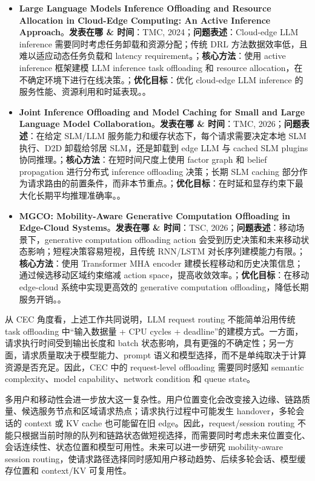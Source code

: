 \documentclass[a4paper,twocolumn,10pt]{ctexart}
\begin{document}
\begin{itemize}
\item \textbf{Large Language Models Inference Offloading and Resource Allocation in Cloud-Edge Computing: An Active Inference Approach}。\textbf{发表在哪 \& 时间}：TMC, 2024；\textbf{问题表述}：Cloud-edge LLM inference 需要同时考虑任务卸载和资源分配；传统 DRL 方法数据效率低，且难以适应动态任务负载和 latency requirement。；\textbf{核心方法}：使用 active inference 框架建模 LLM inference task offloading 和 resource allocation，在不确定环境下进行在线决策。；\textbf{优化目标}：优化 cloud-edge LLM inference 的服务性能、资源利用和时延表现。。
\item \textbf{Joint Inference Offloading and Model Caching for Small and Large Language Model Collaboration}。\textbf{发表在哪 \& 时间}：TMC, 2026；\textbf{问题表述}：在给定 SLM/LLM 服务能力和缓存状态下，每个请求需要决定本地 SLM 执行、D2D 卸载给邻居 SLM，还是卸载到 edge LLM 与 cached SLM plugins 协同推理。；\textbf{核心方法}：在短时间尺度上使用 factor graph 和 belief propagation 进行分布式 inference offloading 决策；长期 SLM caching 部分作为请求路由的前置条件，而非本节重点。；\textbf{优化目标}：在时延和显存约束下最大化长期平均推理准确率。。
\item \textbf{MGCO: Mobility-Aware Generative Computation Offloading in Edge-Cloud Systems}。\textbf{发表在哪 \& 时间}：TSC, 2026；\textbf{问题表述}：移动场景下，generative computation offloading action 会受到历史决策和未来移动状态影响；短程决策容易短视，且传统 RNN/LSTM 对长序列建模能力有限。；\textbf{核心方法}：使用 Transformer MHA encoder 建模长程移动和历史决策信息；通过候选移动区域约束缩减 action space，提高收敛效率。；\textbf{优化目标}：在移动 edge-cloud 系统中实现更高效的 generative computation offloading，降低长期服务开销。。
\end{itemize}



从 CEC 角度看，上述工作共同说明，LLM request routing 不能简单沿用传统 task offloading 中“输入数据量 + CPU cycles + deadline”的建模方式。一方面，请求执行时间受到输出长度和 batch 状态影响，具有更强的不确定性；另一方面，请求质量取决于模型能力、prompt 语义和模型选择，而不是单纯取决于计算资源是否充足。因此，CEC 中的 request-level offloading 需要同时感知 semantic complexity、model capability、network condition 和 queue state。


多用户和移动性会进一步放大这一复杂性。用户位置变化会改变接入边缘、链路质量、候选服务节点和区域请求热点；请求执行过程中可能发生 handover，多轮会话的 context 或 KV cache 也可能留在旧 edge。因此，request/session routing 不能只根据当前时隙的队列和链路状态做短视选择，而需要同时考虑未来位置变化、会话连续性、状态位置和模型可用性。未来可以进一步研究 mobility-aware session routing，使请求路径选择同时感知用户移动趋势、后续多轮会话、模型缓存位置和 context/KV 可复用性。
\end{document}
